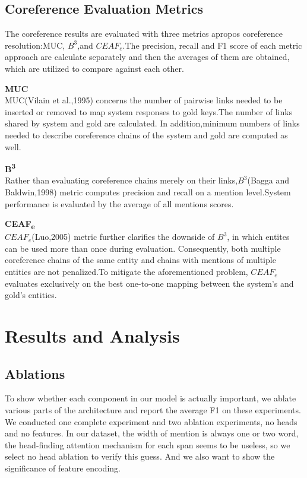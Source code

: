 \documentclass[11pt]{article}
\begin{document}
\subsection{Coreference Evaluation Metrics}
The coreference results are evaluated with three metrics apropos coreference resolution:MUC, $B^{3}$,and $CEAF_e$.The precision, recall and F1 score of each metric approach are calculate separately and then the averages of them are obtained, which are utilized to compare against each other.

\textbf{MUC}\\
MUC(Vilain et al.,1995) concerns the number of pairwise links needed to be inserted or removed to map system responses to gold keys.The number of links shared by  system and gold are calculated. In addition,minimum numbers of links needed to describe coreference chains of the system and gold are computed as well.

\textbf{B\textsuperscript{3}} \\
Rather than evaluating coreference chains merely on their links,$B^{3}$(Bagga and Baldwin,1998) metric computes precision and recall on a mention level.System performance is evaluated by the average of all mentions scores.


\textbf{CEAF\textsubscript{e}} \\
$CEAF_e$(Luo,2005) metric further clarifies the downside of $B^{3}$, in which entites can be used more than once during evaluation. Consequently, both multiple coreference chains of the same entity and chains with mentions of multiple entities are not penalized.To mitigate the aforementioned problem, $CEAF_e$ evaluates exclusively on the best one-to-one mapping between the system’s and gold’s entities.


\section{Results and Analysis}
\subsection{Ablations}
To show whether each component in our model is actually important, we ablate various parts of the architecture and report the average F1 on these experiments. We conducted one complete experiment and two ablation experiments, no heads and no features. In our dataset, the width of mention is always one or two word, the head-finding attention mechanism for each span seems to be useless, so we select no head ablation to verify this guess.  And we also want to show the significance of feature encoding.
\end{document}
